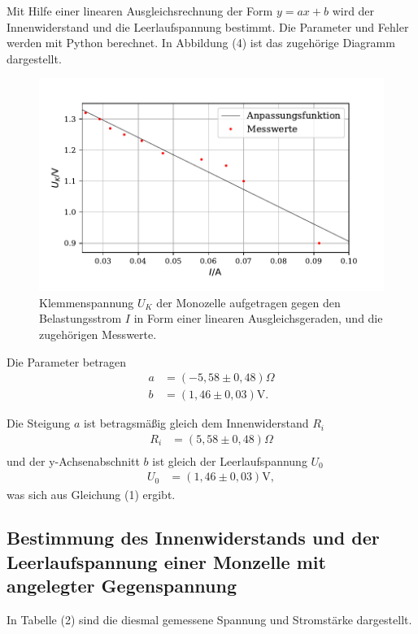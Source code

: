\noindent Mit Hilfe einer linearen Ausgleichsrechnung der Form $y = ax + b $
wird der Innenwiderstand und die Leerlaufspannung bestimmt. Die Parameter und Fehler werden mit Python berechnet.
In Abbildung (4) ist das zugehörige Diagramm dargestellt.
\begin{figure}[H]
  \centering
  \includegraphics{plot1.pdf}
  \caption{Klemmenspannung $U_K$ der Monozelle aufgetragen gegen den Belastungsstrom $I$ in Form einer linearen Ausgleichsgeraden, und die zugehörigen Messwerte.}
  \label{fig:rechteck}
\end{figure}

Die Parameter betragen
\begin{align*}
a &= (-5,58 \pm 0,48)\Omega \\
b &= (1,46 \pm 0,03)\si{\volt} .
\end{align*}

\noindent Die Steigung $a$ ist betragsmäßig gleich dem Innenwiderstand $R_i$
\begin{align*}
R_i &= (5,58 \pm 0,48)\Omega \\
\end{align*}
\noindent und der y-Achsenabschnitt $b$ ist gleich der Leerlaufspannung $U_0$
\begin{align*}
U_0 &= (1,46 \pm 0,03)\si{\volt} ,
\end{align*} 
\noindent was sich aus Gleichung (1) ergibt.

\subsection{Bestimmung des Innenwiderstands und der Leerlaufspannung einer Monzelle mit angelegter Gegenspannung}
In Tabelle (2) sind die diesmal gemessene Spannung und Stromstärke dargestellt.

